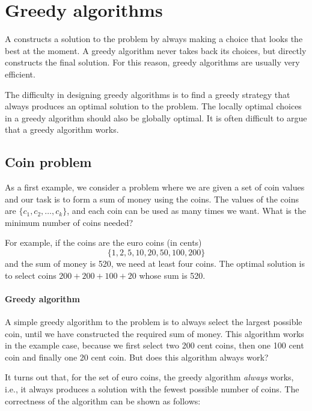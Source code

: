 \chapter{Greedy algorithms}


A 
constructs a solution to the problem
by always making a choice that looks
the best at the moment.
A greedy algorithm never takes back
its choices, but directly constructs
the final solution.
For this reason, greedy algorithms
are usually very efficient.

The difficulty in designing greedy algorithms
is to find a greedy strategy
that always produces an optimal solution
to the problem.
The locally optimal choices in a greedy
algorithm should also be globally optimal.
It is often difficult to argue that
a greedy algorithm works.

\section{Coin problem}

As a first example, we consider a problem
where we are given a set of coin values
and our task is to form a sum of money
using the coins.
The values of the coins are
$\{c_1,c_2,\ldots,c_k\}$,
and each coin can be used as many times we want.
What is the minimum number of coins needed?

For example, if the coins are the euro coins (in cents)
\[\{1,2,5,10,20,50,100,200\}\]
and the sum of money is 520,
we need at least four coins.
The optimal solution is to select coins
$200+200+100+20$ whose sum is 520.

\subsubsection{Greedy algorithm}

A simple greedy algorithm to the problem
is to always select the largest possible coin,
until we have constructed the required sum of money.
This algorithm works in the example case,
because we first select two 200 cent coins,
then one 100 cent coin and finally one 20 cent coin.
But does this algorithm always work?

It turns out that, for the set of euro coins,
the greedy algorithm \emph{always} works, i.e.,
it always produces a solution with the fewest
possible number of coins.
The correctness of the algorithm can be
shown as follows:

